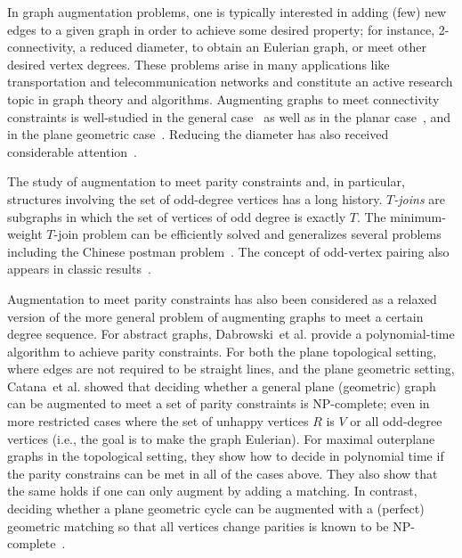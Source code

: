\documentclass[a4paper,runningheads,cleveref,thm-restate]{lipics-v2021}
\newcommand{\etal}{{et al.}\xspace}
\newcommand{\mypar}[1]{\medskip\noindent{\bfseries\boldmath#1}}
\begin{document}
\mypar{Related work.}
In graph augmentation problems, one is typically interested in adding (few) new edges to a given graph in order to achieve some desired property; for instance, 2-connectivity, a reduced diameter, to obtain an Eulerian graph, or meet other desired vertex degrees. 
These problems arise in many applications like transportation and telecommunication networks and constitute an active research topic in graph theory and algorithms. 
%
Augmenting graphs to meet connectivity constraints is well-studied in the general case~\cite{BenczurK00,CenLP22,Tarjan,Frank92,Plesnik1976} as well as in the planar case~\cite{KantBodl1991,RutterWolff2012}, and in the plane geometric case~\cite{ABELLANAS2008,AKITAYA2019,AlJubeh2011,Garcia2015,KRANAKIS2010,RutterWolff2012,TOTH2012}. 
Reducing the diameter has also received considerable attention~\cite{AdriaensG22,AlonGR00,ChungG84,FratiGGM15}.



{The study of augmentation to meet parity constraints and, in particular, structures involving the set of odd-degree vertices has a long history. 
\emph{$T$-joins} are subgraphs in which the set of vertices of odd degree is exactly $T$. 
The minimum-weight $T$-join problem can be efficiently solved and generalizes several problems including the Chinese postman problem~\cite{EdmondsJ73,ChinesePostman1}. 
The concept of odd-vertex pairing also appears in classic results~\cite{maxcut,nash-williams_1960}.
}

Augmentation to meet parity constraints has also been considered as a relaxed version of the more general problem of augmenting graphs to meet a certain degree sequence. 
%
For abstract graphs, Dabrowski~\etal\cite{DABROWSKI2016213} provide a polynomial-time algorithm to achieve parity constraints. 
For both the plane topological setting, where edges are not required to be straight lines, and the plane geometric setting, 
Catana~\etal\cite{Catanaetal} showed that deciding whether a general plane (geometric) graph can be augmented to meet a set of parity constraints is NP-complete; even in more restricted cases where the set of unhappy vertices $R$ is $V$ or all odd-degree vertices 
(i.e., the goal is to make the graph Eulerian).
For maximal outerplane graphs in the topological setting, 
they show how to decide in polynomial time if the parity constrains can be met in all of the cases above. 
They also show that the same holds if one can only augment by adding a matching. 
In contrast, deciding whether a plane geometric cycle 
can be augmented with a (perfect) geometric matching so that 
all vertices change parities 
is known to be NP-complete~\cite{PilzRS020}. 
\end{document}
